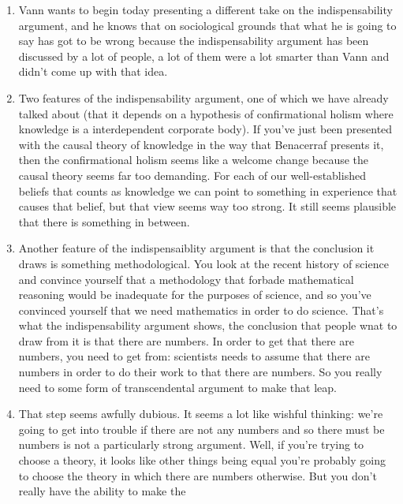 \documentclass[12pt]{article}
\theoremstyle{definition}
\begin{document}
\begin{enumerate}
    \itemsep0em 
    \item
        Vann wants to begin today presenting a different take on the
        indispensability argument, and he knows that on sociological grounds
        that what he is going to say has got to be wrong because the
        indispensability argument has been discussed by a lot of people, a lot
        of them were a lot smarter than Vann and didn't come up with that idea. 
    \item
        Two features of the indispensability argument, one of which we have
        already talked about (that it depends on a hypothesis of confirmational
        holism where knowledge is a interdependent corporate body). If you've
        just been presented with the causal theory of knowledge in the way that
        Benacerraf presents it, then the confirmational holism seems like a
        welcome change because the causal theory seems far too demanding. For
        each of our well-established beliefs that counts as knowledge we can
        point to something in experience that causes that belief, but that view
        seems way too strong. It still seems plausible that there is something
        in between.
    \item
        Another feature of the indispensaiblity argument is that the conclusion
        it draws is something methodological. You look at the recent history of
        science and convince yourself that a methodology that forbade
        mathematical reasoning would be inadequate for the purposes of science,
        and so  you've convinced yourself that we need mathematics in order to
        do science. That's what the indispensability argument shows, the
        conclusion that people wnat to draw from it is that there are numbers.
        In order to get that there are numbers, you need to get from:
        scientists needs to assume that there are numbers in order to do their
        work to that there are numbers. So you really need to some form of
        transcendental argument to make that leap. 
    \item
        That step seems awfully dubious. It seems a lot like wishful thinking:
        we're going to get into trouble if there are not any numbers and so
        there must be numbers is not a particularly strong argument. Well, if
        you're trying to choose a theory, it looks like other things being
        equal you're probably going to choose the theory in which there are
        numbers otherwise. But you don't really have the ability to make the

\end{enumerate}
\end{document}
